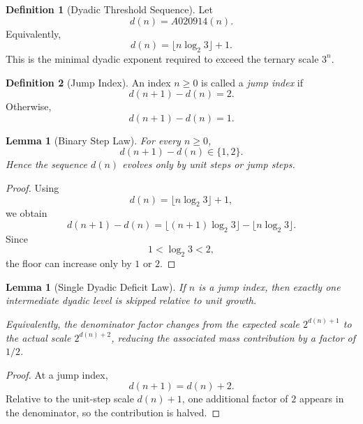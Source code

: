 \documentclass[12pt, oneside]{article}
\numberwithin{equation}{section}
\theoremstyle{definition}
\newtheorem{definition}{Definition}[section]
\theoremstyle{plain}
\newtheorem{lemma}[theorem]{Lemma}
\theoremstyle{remark}
\begin{document}

\begin{definition}[Dyadic Threshold Sequence]
Let
\[
d(n)=A020914(n).
\]
Equivalently,
\[
d(n)=\lfloor n\log_2 3 \rfloor + 1.
\]
This is the minimal dyadic exponent required to exceed the ternary scale
$3^n$.
\end{definition}


\begin{definition}[Jump Index]
An index $n\ge0$ is called a \emph{jump index} if
\[
d(n+1)-d(n)=2.
\]
Otherwise,
\[
d(n+1)-d(n)=1.
\]
\end{definition}


\begin{lemma}[Binary Step Law]
\label{lem:binary-step}
For every $n\ge0$,
\[
d(n+1)-d(n)\in\{1,2\}.
\]
Hence the sequence $d(n)$ evolves only by unit steps or jump steps.
\end{lemma}

\begin{proof}
Using
\[
d(n)=\lfloor n\log_2 3\rfloor+1,
\]
we obtain
\[
d(n+1)-d(n)
=
\lfloor (n+1)\log_2 3\rfloor-\lfloor n\log_2 3\rfloor.
\]
Since
\[
1<\log_2 3<2,
\]
the floor can increase only by $1$ or $2$.
\end{proof}


\begin{lemma}[Single Dyadic Deficit Law]
\label{lem:deficit-law}
If $n$ is a jump index, then exactly one intermediate dyadic level is
skipped relative to unit growth.

Equivalently, the denominator factor changes from the expected scale
$2^{d(n)+1}$ to the actual scale $2^{d(n)+2}$, reducing the associated
mass contribution by a factor of $1/2$.
\end{lemma}

\begin{proof}
At a jump index,
\[
d(n+1)=d(n)+2.
\]
Relative to the unit-step scale $d(n)+1$, one additional factor of $2$
appears in the denominator, so the contribution is halved.
\end{proof}

\end{document}
